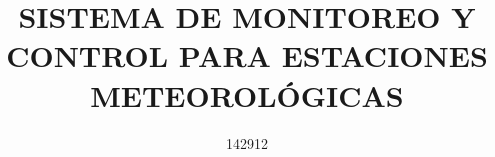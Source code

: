 \documentclass[final, fmstyle, lic]{tesis}
\title{SISTEMA DE MONITOREO Y CONTROL PARA ESTACIONES METEOROLÓGICAS}
\author{142912}{Teo González Calzada}
\begin{document}
\renewcommand{\lstlistingname}{Listado}
\renewcommand{\listingscaption}{Listado}
\renewcommand\listoflistingscaption{Lista de listados}

\maketitle     %
\approvalpage  %
\approvalprint  %
\originalpage


\setcounter{page}{6}




\tableofcontents
\listoffigures
\listoflistings

\setcounter{page}{1}

\setcounter{page}{1}












\appendix   %

% 

\end{document}
